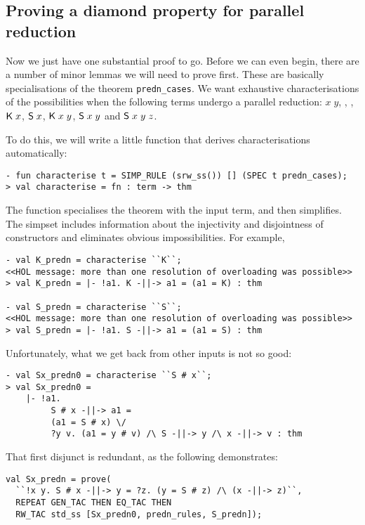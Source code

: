 \subsection{Proving a diamond property for parallel reduction}
\label{sec:predn-diamond}

Now we just have one substantial proof to go.  Before we can even
begin, there are a number of minor lemmas we will need to prove first.
These are basically specialisations of the theorem
\texttt{predn\_cases}.  We want exhaustive characterisations of the
possibilities when the following terms undergo a parallel reduction:
$x\;y$, \KC, \SC, ${\sf K}\;x$, ${\sf S}\;x$, ${\sf K}\;x\;y$, ${\sf S}\;x\;y$ and
${\sf S}\;x\;y\;z$.

To do this, we will write a little function that derives
characterisations automatically:
\begin{session}
\begin{verbatim}
- fun characterise t = SIMP_RULE (srw_ss()) [] (SPEC t predn_cases);
> val characterise = fn : term -> thm
\end{verbatim}
\end{session}
The  function specialises the theorem
 with the input term, and then simplifies.  The
 simpset includes information about the injectivity and
disjointness of constructors and eliminates obvious impossibilities.
For example,
\begin{session}
\begin{verbatim}
- val K_predn = characterise ``K``;
<<HOL message: more than one resolution of overloading was possible>>
> val K_predn = |- !a1. K -||-> a1 = (a1 = K) : thm

- val S_predn = characterise ``S``;
<<HOL message: more than one resolution of overloading was possible>>
> val S_predn = |- !a1. S -||-> a1 = (a1 = S) : thm
\end{verbatim}
\end{session}
Unfortunately, what we get back from other inputs is not so good:
\begin{session}
\begin{verbatim}
- val Sx_predn0 = characterise ``S # x``;
> val Sx_predn0 =
    |- !a1.
         S # x -||-> a1 =
         (a1 = S # x) \/
         ?y v. (a1 = y # v) /\ S -||-> y /\ x -||-> v : thm
\end{verbatim}
\end{session}
That first disjunct is redundant, as the following demonstrates:
\begin{session}
\begin{verbatim}
val Sx_predn = prove(
  ``!x y. S # x -||-> y = ?z. (y = S # z) /\ (x -||-> z)``,
  REPEAT GEN_TAC THEN EQ_TAC THEN
  RW_TAC std_ss [Sx_predn0, predn_rules, S_predn]);
\end{verbatim}
\end{session}
